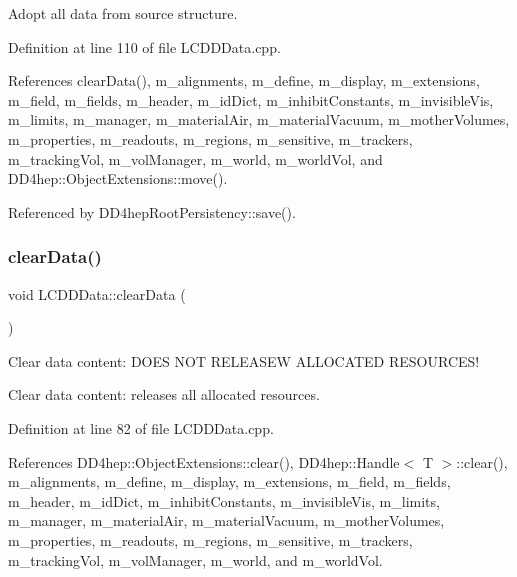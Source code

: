 Adopt all data from source structure. 



Definition at line 110 of file L\+C\+D\+D\+Data.\+cpp.



References clear\+Data(), m\+\_\+alignments, m\+\_\+define, m\+\_\+display, m\+\_\+extensions, m\+\_\+field, m\+\_\+fields, m\+\_\+header, m\+\_\+id\+Dict, m\+\_\+inhibit\+Constants, m\+\_\+invisible\+Vis, m\+\_\+limits, m\+\_\+manager, m\+\_\+material\+Air, m\+\_\+material\+Vacuum, m\+\_\+mother\+Volumes, m\+\_\+properties, m\+\_\+readouts, m\+\_\+regions, m\+\_\+sensitive, m\+\_\+trackers, m\+\_\+tracking\+Vol, m\+\_\+vol\+Manager, m\+\_\+world, m\+\_\+world\+Vol, and D\+D4hep\+::\+Object\+Extensions\+::move().



Referenced by D\+D4hep\+Root\+Persistency\+::save().

\hypertarget{class_d_d4hep_1_1_geometry_1_1_l_c_d_d_data_a6c9bd1b309c7cb21dea26dc6c1504716}{}\label{class_d_d4hep_1_1_geometry_1_1_l_c_d_d_data_a6c9bd1b309c7cb21dea26dc6c1504716} 
\subsubsection{\texorpdfstring{clear\+Data()}{clearData()}}
{\footnotesize\ttfamily void L\+C\+D\+D\+Data\+::clear\+Data (\begin{DoxyParamCaption}{ }\end{DoxyParamCaption})}



Clear data content\+: D\+O\+ES N\+OT R\+E\+L\+E\+A\+S\+EW A\+L\+L\+O\+C\+A\+T\+ED R\+E\+S\+O\+U\+R\+C\+E\+S! 

Clear data content\+: releases all allocated resources. 

Definition at line 82 of file L\+C\+D\+D\+Data.\+cpp.



References D\+D4hep\+::\+Object\+Extensions\+::clear(), D\+D4hep\+::\+Handle$<$ T $>$\+::clear(), m\+\_\+alignments, m\+\_\+define, m\+\_\+display, m\+\_\+extensions, m\+\_\+field, m\+\_\+fields, m\+\_\+header, m\+\_\+id\+Dict, m\+\_\+inhibit\+Constants, m\+\_\+invisible\+Vis, m\+\_\+limits, m\+\_\+manager, m\+\_\+material\+Air, m\+\_\+material\+Vacuum, m\+\_\+mother\+Volumes, m\+\_\+properties, m\+\_\+readouts, m\+\_\+regions, m\+\_\+sensitive, m\+\_\+trackers, m\+\_\+tracking\+Vol, m\+\_\+vol\+Manager, m\+\_\+world, and m\+\_\+world\+Vol.



